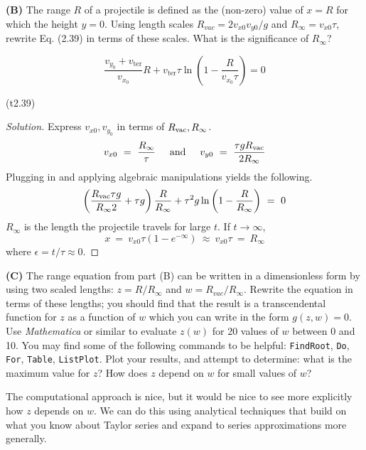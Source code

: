 \documentclass{article}
\numberwithin{equation}{section}
\newcommand{\textAnd}{
    {
        \hspace{5mm}
        \textrm{and}
        \hspace{5mm}
    }
}
\begin{document}
\textbf{(B)} The range $R$ of a projectile is defined as the (non-zero) value of $x = R$ for which the height $y = 0$. Using length scales $R_{vac} =  2v_{x0}v_{y0}/g$ and $R_{\infty} = v_{x0}\tau$, rewrite Eq. (2.39) in terms of these scales. 
{What is the significance of $R_{\infty}$?}

\begin{equation}
\frac{v_{y_0} + v_{\text{ter}}}{v_{x_0}} R + v_{\text{ter}} \tau \ln \left( 1 - \frac{R}{v_{x_0} \tau} \right) = 0
\end{equation}

\hfill (t2.39)


\begin{proof}[Solution]
    Express $v_{x0}, v_{y_0}$ in terms of $R_{\rm vac}, R_\infty$. 
    \begin{equation}
        v_{x0} \ = \ \frac {R_\infty} \tau \textAnd 
        v_{y0} \ = \ \frac {\tau g R_{\rm vac}}{2 R_\infty}
    \end{equation}
    Plugging in and applying algebraic manipulations yields the following. 
    \begin{equation}\label{eqn:Q1Braw}
        \left(
            \frac {R_{\rm vac} \tau g}{R_\infty 2} + \tau g
        \right)\frac {R}{R_\infty} + \tau^2 g \ln\left(
            1 - \frac R {R_{\infty}}
        \right) \ = \ 0
    \end{equation}
    $R_\infty$ is the length the projectile travels for large $t$. 
    If $t \rightarrow \infty$, 
    \[
    x \ = \ v_{x0}\tau (1- e^{-\infty}) \ \approx \ v_{x0}\tau \ = \ R_\infty
    \]where $\epsilon =t/\tau \approx 0$. 
\end{proof}

\textbf{(C)} The range equation from part (B) can be written in a dimensionless form by using two scaled lengths: $z = R/R_{\infty}$ and $w = R_{vac}/R_{\infty}$. Rewrite the equation in terms of these lengths; you should find that the result is a transcendental function for $z$ as a function of $w$ which you can write in the form $g(z, w) = 0$. Use \textit{Mathematica} or similar to evaluate $z(w)$ for 20 values of $w$ between 0 and 10. You may find some of the following commands to be helpful: \texttt{FindRoot}, \texttt{Do}, \texttt{For}, \texttt{Table}, \texttt{ListPlot}. Plot your results, and attempt to determine: what is the maximum value for $z$? How does $z$ depend on $w$ for small values of $w$?

The computational approach is nice, but it would be nice to see more explicitly how $z$ depends on $w$. We can do this using analytical techniques that build on what you know about Taylor series and expand to series approximations more generally.
\end{document}
